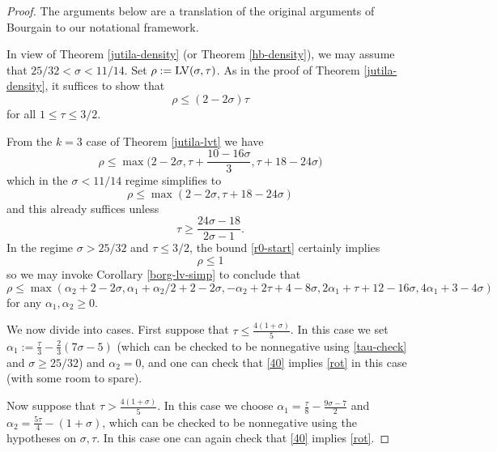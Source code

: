 \begin{proof}  The arguments below are a translation of the original arguments of Bourgain \cite{bourgain_large_2000} to our notational framework.

In view of Theorem \ref{jutila-density} (or Theorem \ref{hb-density}), we may assume that $25/32 < \sigma < 11/14$.  Set $\rho := \mathrm{LV}(\sigma,\tau)$. As in the proof of Theorem \ref{jutila-density}, it suffices to show that
\begin{equation}\label{rot}
    \rho \leq (2-2\sigma) \tau
\end{equation}
for all $1 \leq \tau \leq 3/2$.

From the $k=3$ case of Theorem \ref{jutila-lvt} we have
$$\rho \leq \max \bigg(2-2\sigma, \tau + \frac{10-16\sigma}{3}, \tau + 18-24\sigma \bigg)$$
which in the $\sigma < 11/14$ regime simplifies to
\begin{equation}\label{r0-start}
\rho \leq \max(2-2\sigma, \tau + 18-24\sigma)
\end{equation}
and this already suffices unless
\begin{equation}\label{tau-check}
     \tau \geq \frac{24\sigma-18}{2\sigma-1}.
\end{equation}
In the regime $\sigma > 25/32$ and $\tau \leq 3/2$, the bound \eqref{r0-start} certainly implies
$$ \rho \leq 1$$
so we may invoke Corollary \ref{borg-lv-simp} to conclude that
\begin{equation}\label{40}
     \rho \leq \max( \alpha_2 + 2 - 2 \sigma, \alpha_1+\alpha_2/2 + 2-2\sigma, -\alpha_2 + 2\tau+4-8\sigma, 2\alpha_1 + \tau + 12 - 16 \sigma, 4\alpha_1 + 3-4\sigma)
\end{equation}
for any $\alpha_1, \alpha_2 \geq 0$.

We now divide into cases.  First suppose that $\tau \leq \frac{4(1+\sigma)}{5}$.  In this case we set $\alpha_1 := \frac{\tau}{3} - \frac{2}{3} (7\sigma-5)$ (which can be checked to be nonnegative using \eqref{tau-check} and $\sigma \geq 25/32$) and $\alpha_2=0$, and one can check that \eqref{40} implies \eqref{rot} in this case (with some room to spare).

Now suppose that $\tau > \frac{4(1+\sigma)}{5}$.  In this case we choose $\alpha_1 = \frac{\tau}{8} - \frac{9\sigma-7}{2}$ and $\alpha_2 = \frac{5\tau}{4} - (1+\sigma)$, which can be checked to be nonnegative using the hypotheses on $\sigma,\tau$.  In this case
one can again check that \eqref{40} implies \eqref{rot}.
\end{proof}

